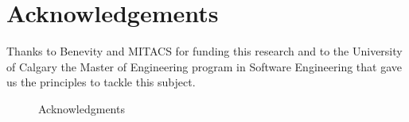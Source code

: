 \section{Acknowledgements}


    Thanks to Benevity and MITACS for funding this research and to the University of Calgary the Master of Engineering program in Software Engineering that gave us the principles to tackle this subject.

    \begin{figure}[!htbp]
        \begin{center}
            \caption{Acknowledgments}
            \label{fig:ackwoledgements}
        \end{center}
    \end{figure}

%
%
%        
%



